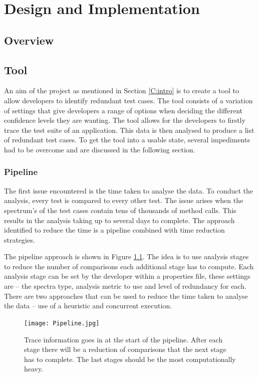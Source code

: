 \chapter{Design and Implementation}\label{C:workdone}

\section{Overview}


\section{Tool}
\label{S:framework}
An aim of the project as mentioned in Section \ref{C:intro} is to create a tool to allow developers to identify redundant test cases. The tool consists of a variation of settings that give developers a range of options when deciding the different confidence levels they are wanting. The tool allows for the developers to firstly trace the test suite of an application. This data is then analysed to produce a list of redundant test cases. To get the tool into a usable state, several impediments had to be overcome and are discussed in the following section. 

\subsection{Pipeline}
The first issue encountered is the time taken to analyse the data. To conduct the analysis, every test is compared to every other test. The issue arises when the spectrum's of the test cases contain tens of thousands of method calls. This results in the analysis taking up to several days to complete. The approach identified to reduce the time is a pipeline combined with time reduction strategies.

The pipeline approach is shown in Figure \ref{fig:pipeline}. The idea is to use analysis stages to reduce the number of comparisons each additional stage has to compute. Each analysis stage can be set by the developer within a properties file, these settings are -- the spectra type, analysis metric to use and level of redundancy for each. There are two approaches that can be used to reduce the time taken to analyse the data -- use of a heuristic and concurrent execution.

\begin{figure}[h]
\texttt{[image: Pipeline.jpg]}
\caption{Trace information goes in at the start of the pipeline. After each stage there will be a reduction of comparisons that the next stage has to complete. The last stages should be the most computationally heavy.}
\label{fig:pipeline}
\end{figure}


